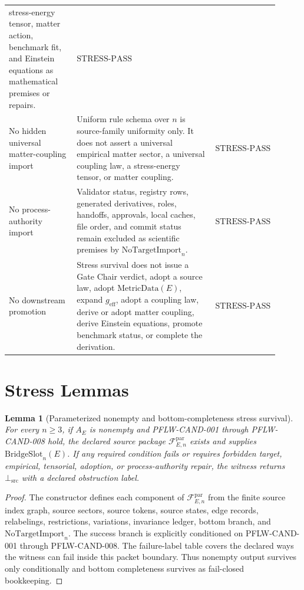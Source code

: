 \documentclass[11pt]{article}
\newcommand{\MetricData}{\mathrm{MetricData}}
\newcommand{\geff}{g_{\mathrm{eff}}}
\newcommand{\BridgeSlot}{\mathrm{BridgeSlot}}
\newcommand{\NoTargetImport}{\mathrm{NoTargetImport}}
\newcommand{\BottomSrc}{\bot_{\mathrm{src}}}
\newcommand{\StressPass}{\mathrm{STRESS}\mbox{-}\mathrm{PASS}}
\newtheorem{lemma}{Lemma}
\begin{document}
\begin{longtable}{p{0.25\linewidth}p{0.51\linewidth}p{0.15\linewidth}}
stress-energy tensor, matter action, benchmark fit, and Einstein equations as
mathematical premises or repairs. & \(\StressPass\) \\
\addlinespace
No hidden universal matter-coupling import &
Uniform rule schema over \(n\) is source-family uniformity only. It does not
assert a universal empirical matter sector, a universal coupling law, a
stress-energy tensor, or matter coupling. & \(\StressPass\) \\
\addlinespace
No process-authority import &
Validator status, registry rows, generated derivatives, roles, handoffs,
approvals, local caches, file order, and commit status remain excluded as
scientific premises by \(\NoTargetImport_n\). & \(\StressPass\) \\
\addlinespace
No downstream promotion &
Stress survival does not issue a Gate Chair verdict, adopt a source law,
adopt \(\MetricData(E)\), expand \(\geff\), adopt a coupling law, derive or
adopt matter coupling, derive Einstein equations, promote benchmark status, or
complete the derivation. & \(\StressPass\) \\
\bottomrule
\end{longtable}

\section{Stress Lemmas}

\begin{lemma}[Parameterized nonempty and bottom-completeness stress survival]
For every \(n\ge 3\), if \(A_E\) is nonempty and PFLW-CAND-001 through
PFLW-CAND-008 hold, the declared source package
\(\mathcal{F}^{\mathrm{par}}_{E,n}\) exists and supplies
\(\BridgeSlot_n(E)\). If any required condition fails or requires forbidden
target, empirical, tensorial, adoption, or process-authority repair, the
witness returns \(\BottomSrc\) with a declared obstruction label.
\end{lemma}

\begin{proof}
The constructor defines each component of
\(\mathcal{F}^{\mathrm{par}}_{E,n}\) from the finite source index graph,
source sectors, source tokens, source states, edge records, relabelings,
restrictions, variations, invariance ledger, bottom branch, and
\(\NoTargetImport_n\). The success branch is explicitly conditioned on
PFLW-CAND-001 through PFLW-CAND-008. The failure-label table covers the
declared ways the witness can fail inside this packet boundary. Thus nonempty
output survives only conditionally and bottom completeness survives as
fail-closed bookkeeping.
\end{proof}
\end{document}
